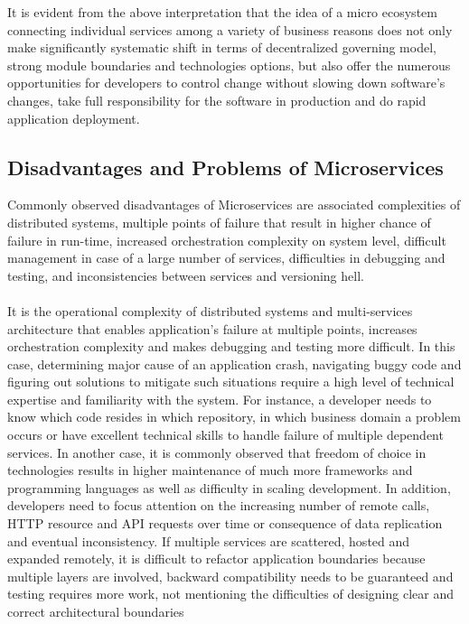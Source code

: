 \documentclass[a4paper]{book}
\begin{document}
It is evident from the above interpretation that the idea of a micro ecosystem connecting individual services among a variety of business reasons does not only make significantly systematic shift in terms of decentralized governing model, strong module boundaries and technologies options, but also offer the numerous opportunities for developers to control change without slowing down software's changes, take full responsibility for the software in production and do rapid application deployment.

\subsection{Disadvantages and Problems of Microservices} \label{Disadvantages and Problems of Microservices}

Commonly observed disadvantages of Microservices are associated complexities of distributed systems, multiple points of failure that result in higher chance of failure in run-time, increased orchestration complexity on system level, difficult management in case of a large number of services, difficulties in debugging and testing, and inconsistencies between services and versioning hell.
\\ \\
It is the operational complexity of distributed systems and multi-services architecture that enables application’s failure at multiple points, increases orchestration complexity and makes debugging and testing more difficult. In this case, determining major cause of an application crash, navigating buggy code and figuring out solutions to mitigate such situations require a high level of technical expertise and familiarity with the system. For instance, a developer needs to know which code resides in which repository, in which business domain a problem occurs or have excellent technical skills to handle failure of multiple dependent services. In another case, it is commonly observed that freedom of choice in technologies results in higher maintenance of much more frameworks and programming languages as well as difficulty in scaling development. In addition, developers need to focus attention on the increasing number of remote calls, HTTP resource and API requests over time or consequence of data replication and eventual inconsistency. If multiple services are scattered, hosted and expanded remotely, it is difficult to refactor application boundaries because multiple layers are involved, backward compatibility needs to be guaranteed and testing requires more work, not mentioning the difficulties of designing clear and correct architectural boundaries
\\ \\
\end{document}
